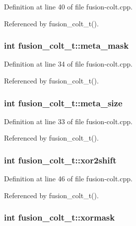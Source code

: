 Definition at line 40 of file fusion-colt.cpp.

Referenced by fusion\_\-colt\_\-t().
\subsubsection[{meta\_\-mask}]{\setlength{\rightskip}{0pt plus 5cm}int {\bf fusion\_\-colt\_\-t::meta\_\-mask}\hspace{0.3cm}{\tt  [protected]}}\label{classfusion__colt__t_2a25ee5f93ff219a80d68389dc93b61a}




Definition at line 34 of file fusion-colt.cpp.

Referenced by fusion\_\-colt\_\-t().
\subsubsection[{meta\_\-size}]{\setlength{\rightskip}{0pt plus 5cm}int {\bf fusion\_\-colt\_\-t::meta\_\-size}\hspace{0.3cm}{\tt  [protected]}}\label{classfusion__colt__t_9bc320921224f09a5ca72000c525c999}




Definition at line 33 of file fusion-colt.cpp.

Referenced by fusion\_\-colt\_\-t().
\subsubsection[{xor2shift}]{\setlength{\rightskip}{0pt plus 5cm}int {\bf fusion\_\-colt\_\-t::xor2shift}\hspace{0.3cm}{\tt  [protected]}}\label{classfusion__colt__t_b12be914d3a82619474897b84047b49b}




Definition at line 46 of file fusion-colt.cpp.

Referenced by fusion\_\-colt\_\-t().
\subsubsection[{xormask}]{\setlength{\rightskip}{0pt plus 5cm}int {\bf fusion\_\-colt\_\-t::xormask}\hspace{0.3cm}{\tt  [protected]}}\label{classfusion__colt__t_efd85049f01605f48f812013ae8c26ba}




